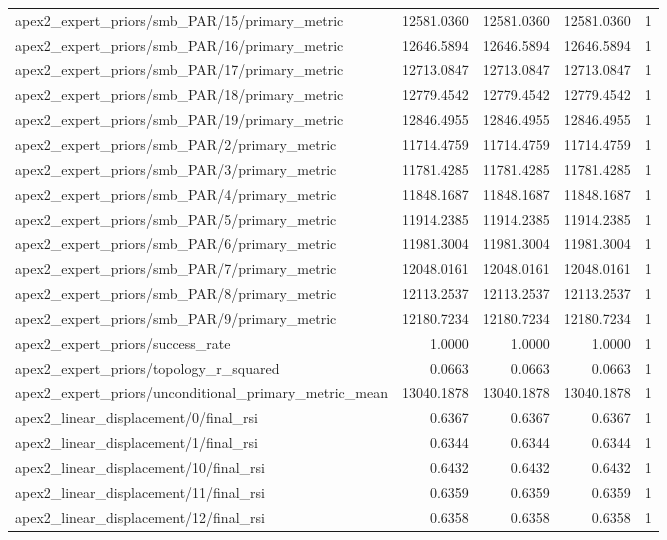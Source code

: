 \begin{table}[h]
\begin{tabular}{lrrrr}
apex2_expert_priors/smb_PAR/15/primary_metric & 12581.0360 & 12581.0360 & 12581.0360 & 1 \\
apex2_expert_priors/smb_PAR/16/primary_metric & 12646.5894 & 12646.5894 & 12646.5894 & 1 \\
apex2_expert_priors/smb_PAR/17/primary_metric & 12713.0847 & 12713.0847 & 12713.0847 & 1 \\
apex2_expert_priors/smb_PAR/18/primary_metric & 12779.4542 & 12779.4542 & 12779.4542 & 1 \\
apex2_expert_priors/smb_PAR/19/primary_metric & 12846.4955 & 12846.4955 & 12846.4955 & 1 \\
apex2_expert_priors/smb_PAR/2/primary_metric & 11714.4759 & 11714.4759 & 11714.4759 & 1 \\
apex2_expert_priors/smb_PAR/3/primary_metric & 11781.4285 & 11781.4285 & 11781.4285 & 1 \\
apex2_expert_priors/smb_PAR/4/primary_metric & 11848.1687 & 11848.1687 & 11848.1687 & 1 \\
apex2_expert_priors/smb_PAR/5/primary_metric & 11914.2385 & 11914.2385 & 11914.2385 & 1 \\
apex2_expert_priors/smb_PAR/6/primary_metric & 11981.3004 & 11981.3004 & 11981.3004 & 1 \\
apex2_expert_priors/smb_PAR/7/primary_metric & 12048.0161 & 12048.0161 & 12048.0161 & 1 \\
apex2_expert_priors/smb_PAR/8/primary_metric & 12113.2537 & 12113.2537 & 12113.2537 & 1 \\
apex2_expert_priors/smb_PAR/9/primary_metric & 12180.7234 & 12180.7234 & 12180.7234 & 1 \\
apex2_expert_priors/success_rate & 1.0000 & 1.0000 & 1.0000 & 1 \\
apex2_expert_priors/topology_r_squared & 0.0663 & 0.0663 & 0.0663 & 1 \\
apex2_expert_priors/unconditional_primary_metric_mean & 13040.1878 & 13040.1878 & 13040.1878 & 1 \\
apex2_linear_displacement/0/final_rsi & 0.6367 & 0.6367 & 0.6367 & 1 \\
apex2_linear_displacement/1/final_rsi & 0.6344 & 0.6344 & 0.6344 & 1 \\
apex2_linear_displacement/10/final_rsi & 0.6432 & 0.6432 & 0.6432 & 1 \\
apex2_linear_displacement/11/final_rsi & 0.6359 & 0.6359 & 0.6359 & 1 \\
apex2_linear_displacement/12/final_rsi & 0.6358 & 0.6358 & 0.6358 & 1 \\

\end{tabular}
\end{table}
